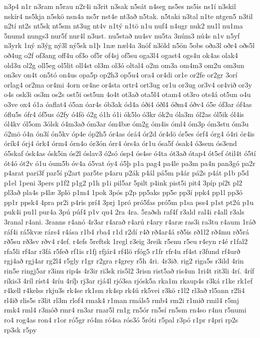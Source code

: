 {n3p4
n1r
n3ram
n5rau
n2r4i
n3rit
n3sak
n5sát
n4seg
ns5es
ns5is
ns1í
n3skil
nskír4
ns5kja
n5skö
nsn4a
ns5r
nst4e
nt3að
n5tak.
n5taki
n3tal
n1te
ntgen5
n3til
n2tí
nt2s
nt5sk
nt5sm
nt3ug
nt4v
n1tý
n1tö
n1u
nuf4
n4ugr
nuk2
nu1l
nu1ma
5numd
nungs3
nur5f
nur4l
n3ust.
nu5stað
nu4sv
nu5ta
3núm3
nú4s
n1v
n5yf
n3yrk
1ný
n3ýg
ný3l
ný5sk
n1þ
1næ
næl4a
3nöf
n3öld
n5ön
5obs
oða3l
oðr4
oðs5l
oð4ug
o2f
of3ang
off4u
of3o
of5r
of4sj
of5su
oga3l4
ogast4
ogs4u
ok4as
olak4
old3u
ol2g
oll5eg
ol5lit
oll4st
ol3m
ol3ó
oltal4
o2m
om3a
om4m3
om2u
om3un
on3sv
on4t
on5tó
on4us
opa5p
op2h3
op5u4
ora4
or4di
or1e
or2fe
or2gr
3orí
orlag4
or2ma
or4mi
4orn
or4ne
or4sta
ortr4
ort3ug
or1u
or3ug
or3v4
or4við
or3y
o4s
osk3i
os3m
os2s
ost5i
ost5un
4o4t
ot3að
ota5l4
otam4
ot3ro
ots4á
ot5un
o4u
o3ve
ox4
ó1a
óaflat4
ó5an
óar4s
ób3ak
ód4a
óði4
óðl4
óðm4
óðv4
ó5e
óf3ar
óf4as
óflu5s
ófr4
óf5us
ó2fy
ó4fö
ó2g
ó1h
ó1i
ók5lo
ó3kr
ók2u
óla3m
ól2as
ól5ik
ól4is
ól4kv
ól5om
3ólsk
ó4m3að
óm3ar
óm4bæ
óm2g
óm4is
óml4
óm3p
óm3stu
óm3u
ó2mö
ó4n
ón3í
ón5kv
óp4e
óp2h5
ór4as
órá4
ór2d
ór4dö
ór5es
órf4
órg4
ó4ri
ór4is
órík4
órj4
órk4
órm4
órn4o
ór3ón
órr4
órs4a
ór1u
ósa5f
ósak4
ó3sem
ós3end
ó5skaf
ósk4as
ósk5in
ós2l
óslav3
ó2só
ósp4
ós4se
ó4ta
ót3að
ótap4
ót5ef
ótil4t
ó5tí
ót4ó
ót2v
ó1u
óum5b
óv4a
ó5vat
óy4
ó5þ
p1a
pag4
pa4le
pa3m
pa4n
pan3gó
pa2r
p4arat
pari3f
par5í
p2art
par5te
p4aru
p2ák
p4ál
pá5m
p4ár
pá2s
p4át
p1b
p5d
p1el
1peni
3pers
p1f2
p1g2
p1h
p1i
pil5ar
5pilt
p4ink
pist5i
pit4
3píp
pí2t
pl2
pl3að
pla4s
p4læ
3plö
p1m4
1pok
3pós
p2p
pp5aks
pp5e
pp3í
ppk4
pp1l
pp3ó
pp1r
ppsk4
4pra
pr2i
p4ris
prí4
3prj
1pró
pró5fas
pró5m
p1sa
pss4
p1st
pt2ú
p1u
puk4i
pu1l
pur4a
3pú
púf4
p1v
qu4
2ra
4ra.
5raðsh
raf4f
r3ald
ral4i
r4all
r3als
3ranal
r4ani.
3ranns
r4anó
4r3ar
r4arað
r4arú
r4ary
r4aræ
ras3i
ra3tu
r4aum
1ráð
ráf4i
rá5kvæ
rárs4
r4ása
r1b4
rba4
r1d
r2dí
r4ð
rð4ar4á
rð5is
rð1l2
rð4mu
rð5rá
rð5su
rð3sv
rðv4
r4ef.
r4efs
5reftsk
1regl
r3eig
3reik
r5enu
r5eu
r4eyn
r4é
r1fal2
rfa5li
rf4ar
r3fá
r5feð
rf1is
r1fj
rfjár4
rf4lö
rfóg5
r1fr
rfr4u
rf4st
r3fund
rf4urð
rgj4að
rgj4ar
rg2l4
r5gly
r1gr
r2gra
r4grey
r5h
4ri.
4r3ið.
rig2
riga5s
r3ild
4rin
rin5e
ringj5ar
r3inu
rip4s
4r3ir
ri3sk
ris5l2
3risn
rist5að
ris4un
1ri4t
rit3li
4rí.
4ríf
ríkis3
4ríl
ríst4
4ríu
4ríþ
rj3ar
rjá4l
rjó3sa
rjósk5a
rka1m
rkaup4s
r3ká
r1ke
rk1ef
r4kell
r4kelss
rkju3s
rk4se
rk1sm
rk4sp
rk4ú
rk5vei
r3kö
r1l2
rl3að
rl5ann
r2li4
rl4ið
rlis5s
r3lit
rl3m
rlof4
rmak4
r1man
rmáls5
rmb4
rm2i
r1mið
rmil4
r5mj
rmk4
rml4
r3móð
rmr4
rn3ar
rnar5l
rn1g
rn5ór
rn5sí
rn5sm
rn4so
r4nu
r5numi
ro4
rog4as
ron4
r1or
ró5gr
ró4m
ró4sa
rós3ó
5róti
r5pal
r3pó
r1pr
r4pri
rp2s
rp3sk
r5py
}
